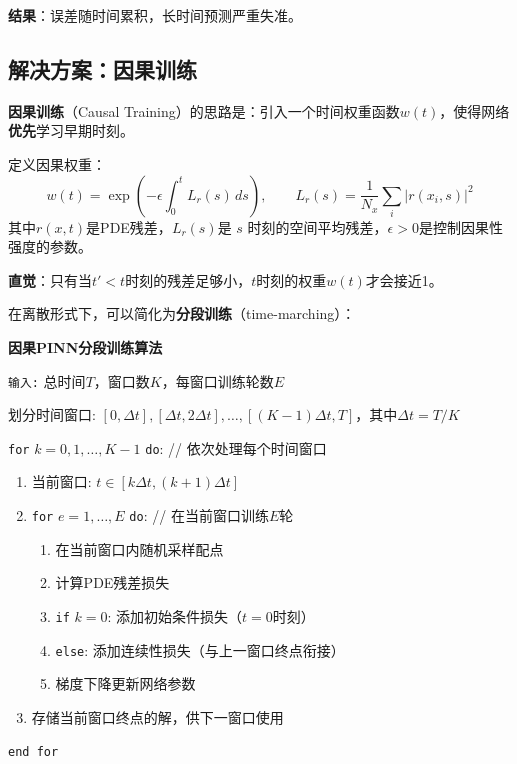\textbf{结果}：误差随时间累积，长时间预测严重失准。

\subsection{解决方案：因果训练}

\textbf{因果训练}（Causal Training）的思路是：引入一个时间权重函数$w(t)$，使得网络\textbf{优先}学习早期时刻。

\begin{definition}[因果权重函数]
定义因果权重：
\begin{equation}
    w(t) = \exp\left( -\epsilon \int_0^t L_r(s) \, ds \right), \qquad L_r(s) = \frac{1}{N_x}\sum_i |r(x_i, s)|^2
\end{equation}
其中$r(x, t)$是PDE残差，$L_r(s)$是 $s$ 时刻的空间平均残差，$\epsilon > 0$是控制因果性强度的参数。
\end{definition}

\textbf{直觉}：只有当$t' < t$时刻的残差足够小，$t$时刻的权重$w(t)$才会接近1。

在离散形式下，可以简化为\textbf{分段训练}（time-marching）：

\begin{framed}
\textbf{因果PINN分段训练算法}

\texttt{输入:} 总时间$T$，窗口数$K$，每窗口训练轮数$E$

划分时间窗口: $[0, \Delta t], [\Delta t, 2\Delta t], \ldots, [(K-1)\Delta t, T]$，其中$\Delta t = T/K$

\texttt{for} $k = 0, 1, \ldots, K-1$ \texttt{do}: \hfill {\small // 依次处理每个时间窗口}
\begin{enumerate}[label=(\alph*), leftmargin=2em]
    \item 当前窗口: $t \in [k\Delta t, (k+1)\Delta t]$
    \item \texttt{for} $e = 1, \ldots, E$ \texttt{do}: \hfill {\small // 在当前窗口训练$E$轮}
    \begin{enumerate}[label=\roman*., leftmargin=1.8em]
        \item 在当前窗口内随机采样配点
        \item 计算PDE残差损失
        \item \texttt{if} $k = 0$: 添加初始条件损失（$t=0$时刻）
        \item \texttt{else}: 添加连续性损失（与上一窗口终点衔接）
        \item 梯度下降更新网络参数
    \end{enumerate}
    \item 存储当前窗口终点的解，供下一窗口使用
\end{enumerate}
\texttt{end for}
\end{framed}

